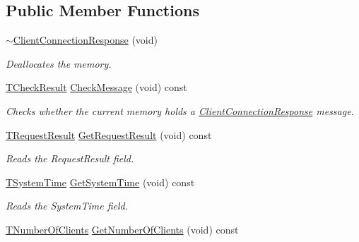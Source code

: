 \subsection*{Public Member Functions}
\begin{DoxyCompactItemize}
\item 
\hyperlink{class_terra_swarm_1_1_synchronous_1_1_client_connection_response_a7724857b04c7711aa3d197313b629b74}{$\sim$\-Client\-Connection\-Response} (void)
\begin{DoxyCompactList}\small\item\em Deallocates the memory. \end{DoxyCompactList}\item 
\hyperlink{class_terra_swarm_1_1_synchronous_1_1_client_connection_response_a33254e9e1216ca2dde89b8a66f7ad18e}{T\-Check\-Result} \hyperlink{class_terra_swarm_1_1_synchronous_1_1_client_connection_response_ad15e893416857bab01902838eee36af4}{Check\-Message} (void) const 
\begin{DoxyCompactList}\small\item\em Checks whether the current memory holds a \hyperlink{class_terra_swarm_1_1_synchronous_1_1_client_connection_response}{Client\-Connection\-Response} message. \end{DoxyCompactList}\item 
\hyperlink{class_terra_swarm_1_1_synchronous_1_1_client_connection_response_a4b55c1f852e288564e5aa00e882f80d5}{T\-Request\-Result} \hyperlink{class_terra_swarm_1_1_synchronous_1_1_client_connection_response_a68294b87ea430db689b58bb56d73c969}{Get\-Request\-Result} (void) const 
\begin{DoxyCompactList}\small\item\em Reads the Request\-Result field. \end{DoxyCompactList}\item 
\hyperlink{class_terra_swarm_1_1_synchronous_1_1_client_connection_response_a7b389f7e89631ce7c758c3a26c46c303}{T\-System\-Time} \hyperlink{class_terra_swarm_1_1_synchronous_1_1_client_connection_response_a1f309c374b8e5197a65d0248cbdcf5d2}{Get\-System\-Time} (void) const 
\begin{DoxyCompactList}\small\item\em Reads the System\-Time field. \end{DoxyCompactList}\item 
\hyperlink{class_terra_swarm_1_1_synchronous_1_1_client_connection_response_adc391c9557f0acfdb0763043058cdf83}{T\-Number\-Of\-Clients} \hyperlink{class_terra_swarm_1_1_synchronous_1_1_client_connection_response_aae66d7183246c6eac58aa961bff7f293}{Get\-Number\-Of\-Clients} (void) const 

\end{DoxyCompactItemize}
